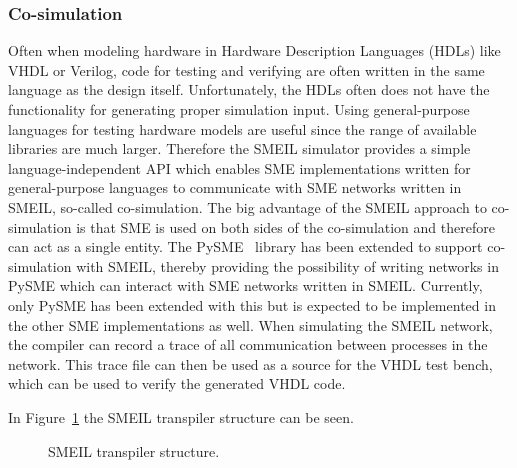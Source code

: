 \subsubsection{Co-simulation}
Often when modeling hardware in Hardware Description Languages (HDLs) like VHDL or Verilog, code for testing and verifying are often written in the same language as the design itself. Unfortunately, the HDLs often does not have the functionality for generating proper simulation input. Using general-purpose languages for testing hardware models are useful since the range of available libraries are much larger.
Therefore the SMEIL simulator provides a simple language-independent API which enables SME implementations written for general-purpose languages to communicate with SME networks written in SMEIL, so-called co-simulation.
The big advantage of the SMEIL approach to co-simulation is that SME is used on both sides of the co-simulation and therefore can act as a single entity.
The PySME~\cite{pysme} library has been extended to support co-simulation with SMEIL, thereby providing the possibility of writing networks in PySME which can interact with SME networks written in SMEIL. Currently, only PySME has been extended with this but is expected to be implemented in the other SME implementations as well.
When simulating the SMEIL network, the compiler can record a trace of all communication between processes in the network. This trace file can then be used as a source for the VHDL test bench, which can be used to verify the generated VHDL code.

In Figure~\ref{fig:smeil_transpiler} the SMEIL transpiler structure can be seen.

\begin{figure}[!ht]
  \centering
  \caption{SMEIL transpiler structure.}
  \label{fig:smeil_transpiler}
\end{figure}
